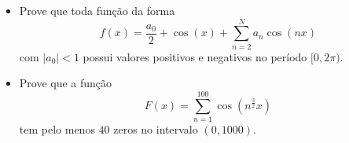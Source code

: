 \begin{itemize}
\item[(a)] Prove que toda função da forma
\[f(x)=\frac{a_{0}}{2}+\cos(x)+\sum_{n=2}^{N}a_{n}\cos(nx)\]com \(|a_{0}|<1\) possui valores positivos e negativos no período \([0,2\pi)\).
\item[(b)] Prove que a função
\[F(x)=\sum_{n=1}^{100}\cos(n^{\frac{3}{2}}x)\]tem pelo menos \(40\) zeros no intervalo \((0,1000)\).
\end{itemize}
